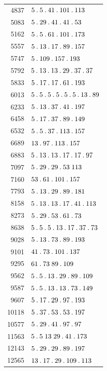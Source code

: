 \begin{longtable}{@{}r|l@{}}
4837 & $5\pdot 5\pdot 41\pdot 101\pdot 113$\\
5083 & $5\pdot 29\pdot 41\pdot 41\pdot 53$\\
5162 & $5\pdot 5\pdot 61\pdot 101\pdot 173$\\
5557 & $5\pdot 13\pdot 17\pdot 89\pdot 157$\\
5747 & $5\pdot 109\pdot 157\pdot 193$\\
5792 & $5\pdot 13\pdot 13\pdot 29\pdot 37\pdot 37$\\
5833 & $5\pdot 17\pdot 17\pdot 61\pdot 193$\\
6013 & $5\pdot 5\pdot 5\pdot 5\pdot 5\pdot 5\pdot 13\pdot 89$\\
6233 & $5\pdot 13\pdot 37\pdot 41\pdot 197$\\
6458 & $5\pdot 17\pdot 37\pdot 89\pdot 149$\\
6532 & $5\pdot 5\pdot 37\pdot 113\pdot 157$\\
6689 & $13\pdot 97\pdot 113\pdot 157$\\
6883 & $5\pdot 13\pdot 13\pdot 17\pdot 17\pdot 97$\\
7097 & $5\pdot 29\pdot 29\pdot 53\;113$\\
7160 & $53\pdot 61\pdot 101\pdot 157$\\
7793 & $5\pdot 13\pdot 29\pdot 89\pdot 181$\\
8158 & $5\pdot 13\pdot 13\pdot 17\pdot 41\pdot 113$\\
8273 & $5\pdot 29\pdot 53\pdot 61\pdot 73$\\
8638 & $5\pdot 5\pdot 5\pdot 13\pdot 17\pdot 37\pdot 73$\\
9028 & $5\pdot 13\pdot 73\pdot 89\pdot 193$\\
9101 & $41\pdot 73\pdot 101\pdot 137$\\
9295 & $61\pdot 73\;89\pdot 109$\\
9562 & $5\pdot 5\pdot 13\pdot 29\pdot 89\pdot 109$\\
9587 & $5\pdot 5\pdot 13\pdot 13\pdot 73\pdot 149$\\
9607 & $5\pdot 17\pdot 29\pdot 97\pdot 193$\\
10118 & $5\pdot 37\pdot 53\pdot 53\pdot 197$\\
10577 & $5\pdot 29\pdot 41\pdot 97\pdot 97$\\
11563 & $5\pdot 5\;13\;29\pdot 41\pdot 173$\\
12143 & $5\pdot 29\pdot 29\pdot 89\pdot 197$\\
12565 & $13\pdot 17\pdot 29\pdot 109\pdot 113$\\

\end{longtable}
